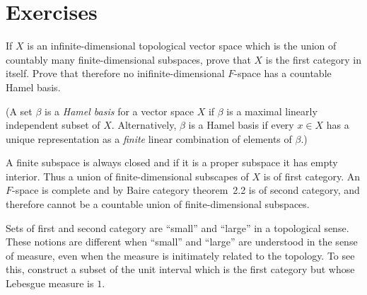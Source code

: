 
\section{Exercises} %

\begin{enumerate}

\begin{excopy}
If $X$ is an infinite-dimensional topological vector space which is the union
of countably many finite-dimensional subspaces, 
prove that $X$ is the 
first category in itself.
Prove that therefore no inifinite-dimensional $F$-space has a countable
Hamel basis.

(A set \(\beta\) is a 
\emph{Hamel basis} for a vector space $X$ if \(\beta\) is a maximal linearly 
independent subset of $X$. Alternatively, \(\beta\) is a Hamel basis if every
\(x\in X\) has a unique representation as a \emph{finite} linear combination
of elements of \(\beta\).)
\end{excopy}

A finite subspace is always closed and if it is a proper subspace
it has empty interior. Thus a union of finite-dimensional subscapes
of $X$ is of first category. An $F$-space is complete and by
Baire category theorem~2.2 is of second category, and therefore
cannot be a countable union of finite-dimensional subspaces.

\begin{excopy}
Sets of first and second category 
are ``small'' and ``large'' in a topological sense.
These notions are different when
``small'' and ``large'' are understood in the sense of measure,
even when the measure is initimately related to the topology.
To see this, construct a subset of the unit interval which is the
first category but whose Lebesgue measure is $1$.
\end{excopy}


\end{enumerate}
